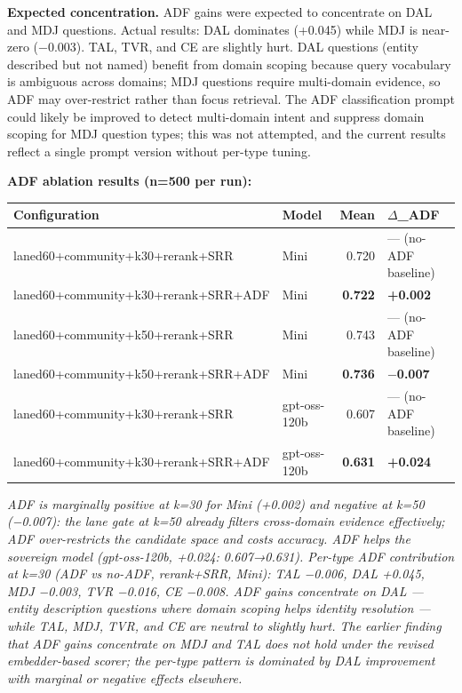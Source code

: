 \textbf{Expected concentration.} ADF gains were expected to concentrate on DAL and MDJ questions. Actual results: DAL dominates (+0.045) while MDJ is near-zero (−0.003). TAL, TVR, and CE are slightly hurt. DAL questions (entity described but not named) benefit from domain scoping because query vocabulary is ambiguous across domains; MDJ questions require multi-domain evidence, so ADF may over-restrict rather than focus retrieval. The ADF classification prompt could likely be improved to detect multi-domain intent and suppress domain scoping for MDJ question types; this was not attempted, and the current results reflect a single prompt version without per-type tuning.

\textbf{ADF ablation results (n=500 per run):}

\begin{small}
\setlength{\tabcolsep}{4pt}
\begin{longtable}{p{2.4in}p{0.9in}rp{1.2in}}
\toprule
\textbf{Configuration} & \textbf{Model} & \textbf{Mean} & \textbf{$\Delta$\_ADF} \\
\midrule
\endhead
laned60+community+k30+rerank+SRR & Mini & 0.720 & — (no-ADF baseline) \\
laned60+community+k30+rerank+SRR+ADF & Mini & \textbf{0.722} & \textbf{+0.002} \\
laned60+community+k50+rerank+SRR & Mini & 0.743 & — (no-ADF baseline) \\
laned60+community+k50+rerank+SRR+ADF & Mini & \textbf{0.736} & \textbf{$-$0.007} \\
laned60+community+k30+rerank+SRR & gpt-oss-120b & 0.607 & — (no-ADF baseline) \\
laned60+community+k30+rerank+SRR+ADF & gpt-oss-120b & \textbf{0.631} & \textbf{+0.024} \\
\bottomrule
\end{longtable}
\end{small}

\emph{ADF is marginally positive at k=30 for Mini (+0.002) and negative at k=50 (−0.007): the lane gate at k=50 already filters cross-domain evidence effectively; ADF over-restricts the candidate space and costs accuracy. ADF helps the sovereign model (gpt-oss-120b, +0.024: 0.607→0.631). Per-type ADF contribution at k=30 (ADF vs no-ADF, rerank+SRR, Mini): TAL −0.006, DAL +0.045, MDJ −0.003, TVR −0.016, CE −0.008. ADF gains concentrate on DAL --- entity description questions where domain scoping helps identity resolution --- while TAL, MDJ, TVR, and CE are neutral to slightly hurt. The earlier finding that ADF gains concentrate on MDJ and TAL does not hold under the revised embedder-based scorer; the per-type pattern is dominated by DAL improvement with marginal or negative effects elsewhere.}

